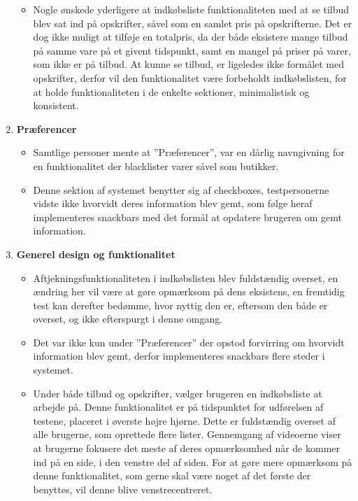 \begin{enumerate}
\begin{itemize}
   								  \item Nogle ønskede yderligere at indkøbsliste funktionaliteten med at se tilbud blev sat ind på opskrifter, såvel som en samlet pris på opskrifterne.
   								  Det er dog ikke muligt at tilføje en totalpris, da der både eksistere mange tilbud på samme vare på et givent tidspunkt, samt en mangel på priser på varer, som ikke er på tilbud.
   								  At kunne se tilbud, er ligeledes ikke formålet med opskrifter, derfor vil den funktionalitet være forbeholdt indkøbslisten, for at holde funktionaliteten i de enkelte sektioner, minimalistisk og konsistent.
   							   \end{itemize}
   \item \textbf{Præferencer}\begin{itemize}
   								  \item Samtlige personer mente at ''Præferencer'', var en dårlig navngivning for en funktionalitet der blacklister varer såvel som butikker.
   								  
   								  \item Denne sektion af systemet benytter sig af checkboxes, testpersonerne vidste ikke hvorvidt deres information blev gemt, som følge heraf implementeres snackbars med det formål at opdatere brugeren om gemt information.
   							   \end{itemize}
   \item \textbf{Generel design og funktionalitet}\begin{itemize}
   								  \item Aftjekningsfunktionaliteten i indkøbslisten blev fuldstændig overset, en ændring her vil være at gøre opmærksom på dens eksistens, en fremtidig test kan derefter bedømme, hvor nyttig den er, eftersom den både er overset, og ikke efterspurgt i denne omgang.
   								  \item Det var ikke kun under ''Præferencer'' der opstod forvirring om hvorvidt information blev gemt, derfor implementeres snackbars flere steder i systemet.
   								  \item Under både tilbud og opskrifter, vælger brugeren en indkøbsliste at arbejde på.
   								  Denne funktionalitet er på tidspunktet for udførelsen af testene, placeret i øverste højre hjørne.
   								  Dette er fuldstændig overset af alle brugerne, som oprettede flere lister.
   								  Gennemgang af videoerne viser at brugerne fokusere det meste af deres opmærksomhed når de kommer ind på en side, i den venstre del af siden.
   								  For at gøre mere opmærksom på denne funktionalitet, som gerne skal være noget af det første der benyttes, vil denne blive venstrecentreret.
   							   \end{itemize}
\end{enumerate}

